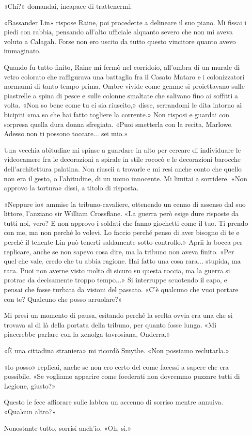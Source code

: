 «Chi?» domandai, incapace di trattenermi.

«Bassander Lin» rispose Raine, poi procedette a delineare il suo piano.
Mi fissai i piedi con rabbia, pensando all'alto ufficiale alquanto
severo che non mi aveva voluto a Calagah. Forse non ero uscito da tutto
questo vincitore quanto avevo immaginato.

\begin{figure}
	\centering
	\def\svgwidth{\columnwidth}
	\scalebox{0.2}{}
\end{figure}

Quando fu tutto finito, Raine mi fermò nel corridoio, all'ombra di un
murale di vetro colorato che raffigurava una battaglia fra il Casato
Mataro e i colonizzatori normanni di tanto tempo prima. Ombre vivide
come gemme si proiettavano sulle piastrelle a spina di pesce e sulle
colonne smaltate che salivano fino ai soffitti a volta. «Non so bene
come tu ci sia riuscito,» disse, serrandomi le dita intorno ai bicipiti
«ma so che hai fatto togliere la corrente.» Non risposi e guardai con
sorpresa quella dura donna sfregiata. «Puoi smetterla con la recita,
Marlowe. Adesso non ti possono toccare... sei mio.»

Una vecchia abitudine mi spinse a guardare in alto per cercare di
individuare le videocamere fra le decorazioni a spirale in stile rococò
e le decorazioni barocche dell'architettura palatina. Non riuscii a
trovarle e mi resi anche conto che quello non era il gesto, o
l'abitudine, di un uomo innocente. Mi limitai a sorridere. «Non approvo
la tortura» dissi, a titolo di risposta.

«Neppure io» ammise la tribuno-cavaliere, ottenendo un cenno di assenso
dal suo littore, l'anziano sir William Crossflane. «La guerra però esige
dure risposte da tutti noi, vero? E non approvo i soldati che fanno
giochetti come il tuo. Ti prendo con me, ma non perché lo volevi. Lo
faccio perché penso di aver bisogno di te e perché il tenente Lin può
tenerti saldamente sotto controllo.» Aprii la bocca per replicare, anche
se non sapevo cosa dire, ma la tribuno non aveva finito. «Per quel che
vale, credo che tu abbia ragione. Hai fatto una cosa rara... stupida, ma
rara. Puoi non averne visto molto di sicuro su questa roccia, ma la
guerra si protrae da decisamente troppo tempo...» Si interruppe
scuotendo il capo, e pensai che fosse turbata da visioni del passato.
«C'è qualcuno che vuoi portare con te? Qualcuno che posso arruolare?»

Mi presi un momento di pausa, esitando perché la scelta ovvia era una
che si trovava al di là della portata della tribuno, per quanto fosse
lunga. «Mi piacerebbe parlare con la xenolga tavrosiana, Onderra.»

«È una cittadina straniera» mi ricordò Smythe. «Non possiamo
reclutarla.»

«Io posso» replicai, anche se non ero certo del come facessi a sapere
che era possibile. «Se vogliamo apparire come foederati non dovremmo
puzzare tutti di Legione, giusto?»

Questo le fece affiorare sulle labbra un accenno di sorriso mentre
annuiva. «Qualcun altro?»

Nonostante tutto, sorrisi anch'io. «Oh, sì.»

